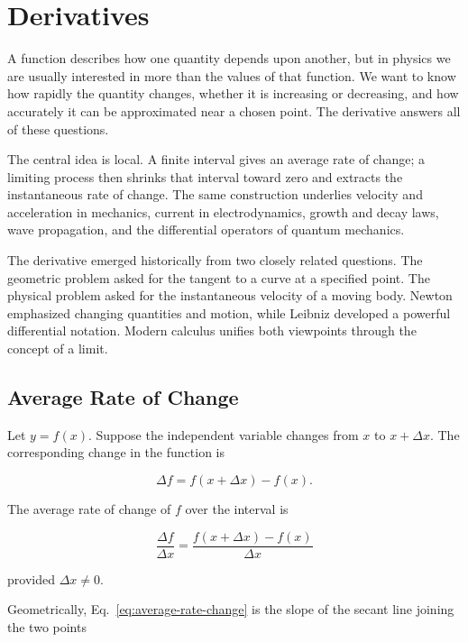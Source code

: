 \section{Derivatives}
\label{sec:derivatives}

A function describes how one quantity depends upon another, but in physics we are usually interested in more than the values of that function. We want to know how rapidly the quantity changes, whether it is increasing or decreasing, and how accurately it can be approximated near a chosen point. The derivative answers all of these questions.

The central idea is local. A finite interval gives an average rate of change; a limiting process then shrinks that interval toward zero and extracts the instantaneous rate of change. The same construction underlies velocity and acceleration in mechanics, current in electrodynamics, growth and decay laws, wave propagation, and the differential operators of quantum mechanics.

\begin{bookhistory}
The derivative emerged historically from two closely related questions. The geometric problem asked for the tangent to a curve at a specified point. The physical problem asked for the instantaneous velocity of a moving body. Newton emphasized changing quantities and motion, while Leibniz developed a powerful differential notation. Modern calculus unifies both viewpoints through the concept of a limit.
\end{bookhistory}

\subsection{Average Rate of Change}

Let $y=f(x)$. Suppose the independent variable changes from $x$ to $x+\Delta x$. The corresponding change in the function is

\[
\Delta f=f(x+\Delta x)-f(x).
\]

The average rate of change of $f$ over the interval is

\begin{equation}
\boxed{
\frac{\Delta f}{\Delta x}
=
\frac{f(x+\Delta x)-f(x)}{\Delta x}
}
\label{eq:average-rate-change}
\end{equation}

provided $\Delta x\neq0$.

Geometrically, Eq.~\eqref{eq:average-rate-change} is the slope of the secant line joining the two points

